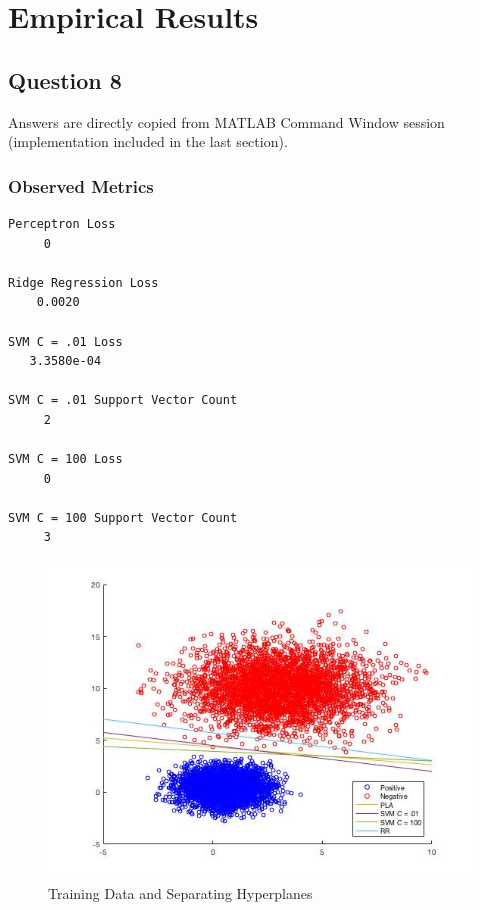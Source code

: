 \documentclass[11pt, oneside]{article}   	%
\begin{document}
\newpage{}
\section{Empirical Results}
\subsection{Question 8}
Answers are directly copied from MATLAB Command Window session (implementation included in the last section).
\subsubsection{Observed Metrics}
\begin{verbatim}
Perceptron Loss 
     0

Ridge Regression Loss 
    0.0020

SVM C = .01 Loss 
   3.3580e-04

SVM C = .01 Support Vector Count 
     2

SVM C = 100 Loss 
     0

SVM C = 100 Support Vector Count 
     3
\end{verbatim}

\begin{figure}
\includegraphics[width=\linewidth]{data.jpg}
  \caption{Training Data and Separating Hyperplanes}
\end{figure}

\newpage{}
\end{document}
